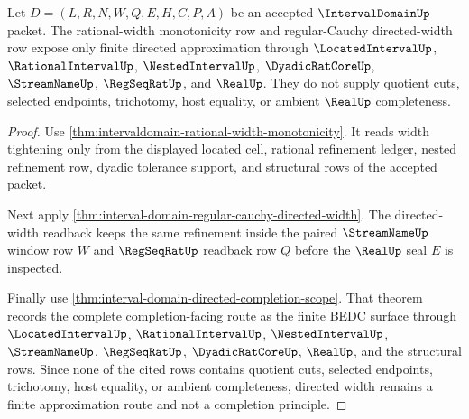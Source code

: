 \begin{theorem}
\label{thm:interval-domain-directed-width-noncompletion}
Let $D=(L,R,N,W,Q,E,H,C,P,A)$ be an accepted $\IntervalDomainUp$ packet. The rational-width monotonicity row and regular-Cauchy directed-width row expose only finite directed approximation through $\LocatedIntervalUp$, $\RationalIntervalUp$, $\NestedIntervalUp$, $\DyadicRatCoreUp$, $\StreamNameUp$, $\RegSeqRatUp$, and $\RealUp$. They do not supply quotient cuts, selected endpoints, trichotomy, host equality, or ambient $\RealUp$ completeness.
\end{theorem}
\begin{proof}
Use \autoref{thm:intervaldomain-rational-width-monotonicity}. It reads width tightening only from the displayed located cell, rational refinement ledger, nested refinement row, dyadic tolerance support, and structural rows of the accepted packet.

Next apply \autoref{thm:interval-domain-regular-cauchy-directed-width}. The directed-width readback keeps the same refinement inside the paired $\StreamNameUp$ window row $W$ and $\RegSeqRatUp$ readback row $Q$ before the $\RealUp$ seal $E$ is inspected.

Finally use \autoref{thm:interval-domain-directed-completion-scope}. That theorem records the complete completion-facing route as the finite BEDC surface through $\LocatedIntervalUp$, $\RationalIntervalUp$, $\NestedIntervalUp$, $\StreamNameUp$, $\RegSeqRatUp$, $\DyadicRatCoreUp$, $\RealUp$, and the structural rows. Since none of the cited rows contains quotient cuts, selected endpoints, trichotomy, host equality, or ambient completeness, directed width remains a finite approximation route and not a completion principle.
\end{proof}

